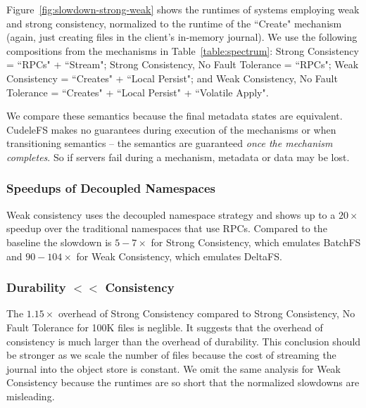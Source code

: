 Figure~\ref{fig:slowdown-strong-weak} shows the runtimes of systems employing
weak and strong consistency, normalized to the runtime of the ``Create"
mechanism (again, just creating files in the client's in-memory journal).  We
use the following compositions from the mechanisms in
Table~\ref{table:spectrum}:  Strong Consistency = ``RPCs" + ``Stream"; Strong
Consistency, No Fault Tolerance = ``RPCs"; Weak Consistency = ``Creates" +
``Local Persist"; and Weak Consistency, No Fault Tolerance = ``Creates" +
``Local Persist" + ``Volatile Apply".

We compare these semantics because the final metadata states are equivalent.
CudeleFS makes no guarantees during execution of the mechanisms or when
transitioning semantics -- the semantics are guaranteed {\it once the mechanism
completes}. So if servers fail during a mechanism, metadata or data may be
lost.

\subsubsection{Speedups of Decoupled Namespaces} Weak consistency uses the
decoupled namespace strategy and shows up to a \(20\times\) speedup over the
traditional namespaces that use RPCs. Compared to the baseline the slowdown is
\(5-7\times\) for Strong Consistency, which emulates BatchFS and
\(90-104\times\) for Weak Consistency, which emulates DeltaFS.

\subsubsection{Durability \(<<\) Consistency} The \(1.15\times\) overhead of
Strong Consistency compared to Strong Consistency, No Fault Tolerance for
100K files is neglible. It suggests that the overhead of consistency is much
larger than the overhead of durability. This conclusion should be stronger as
we scale the number of files because the cost of streaming the journal into the
object store is constant. We omit the same analysis for Weak Consistency
because the runtimes are so short that the normalized slowdowns are misleading.

